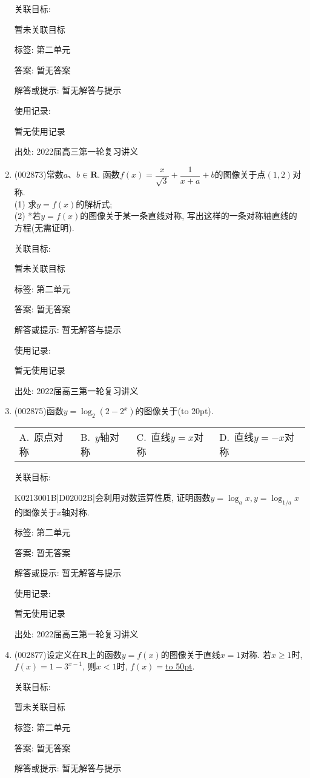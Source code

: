 \documentclass[10pt,a4paper]{article}
\newcommand{\blank}[1]{\underline{\hbox to #1pt{}}}
\newcommand{\bracket}[1]{(\hbox to #1pt{})}
\newcommand{\fourch}[4]{\par\begin{tabular}{p{.23\textwidth}p{.23\textwidth}p{.23\textwidth}p{.23\textwidth}}
A.~#1 &B.~#2& C.~#3& D.~#4
\end{tabular}}
\begin{document}
\begin{enumerate}[1.]
关联目标:

暂未关联目标



标签: 第二单元

答案: 暂无答案

解答或提示: 暂无解答与提示

使用记录:

暂无使用记录


出处: 2022届高三第一轮复习讲义
\item { (002873)}常数$a$、$b\in \mathbf{R}$. 函数$f(x)=\dfrac x{\sqrt 3}+\dfrac 1{x+a}+b$的图像关于点$(1,2)$对称.\\
(1) 求$y=f(x)$的解析式;\\
(2) *若$y=f(x)$的图像关于某一条直线对称, 写出这样的一条对称轴直线的方程(无需证明).


关联目标:

暂未关联目标



标签: 第二单元

答案: 暂无答案

解答或提示: 暂无解答与提示

使用记录:

暂无使用记录


出处: 2022届高三第一轮复习讲义
\item { (002875)}函数$y=\log_2(2-2^x)$的图像关于\bracket{20}.
\fourch{原点对称}{$y$轴对称}{直线$y=x$对称}{直线$y=-x$对称}


关联目标:

K0213001B|D02002B|会利用对数运算性质, 证明函数$y=\log_ax,y=\log_{1/a}x$的图像关于$x$轴对称.



标签: 第二单元

答案: 暂无答案

解答或提示: 暂无解答与提示

使用记录:

暂无使用记录


出处: 2022届高三第一轮复习讲义
\item { (002877)}设定义在$\mathbf{R}$上的函数$y=f(x)$的图像关于直线$x=1$对称. 若$x\ge 1$时, $f(x)=1-3^{x-1}$, 则$x<1$时, $f(x)=$\blank{50}.


关联目标:

暂未关联目标



标签: 第二单元

答案: 暂无答案

解答或提示: 暂无解答与提示


\end{enumerate}
\end{document}
